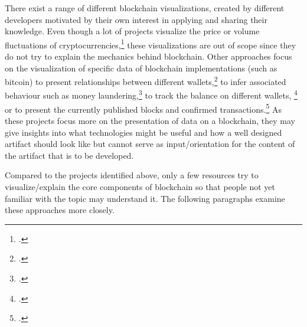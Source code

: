 There exist a range of different blockchain visualizations, created by different developers motivated by their own interest in applying and sharing their knowledge. Even though a lot of projects visualize the price or volume fluctuations of cryptocurrencies,\footcites[Cf.][]{SapekCryptowatchliveBitcoin2014}[cf.][]{CryptoMapsCryptocurrencyMarket} these visualizations are out of scope since they do not try to explain the mechanics behind blockchain. Other approaches focus on the visualization of specific data of blockchain implementations (such as bitcoin) to present relationships between different wallets,\footcites[Cf.][]{Reidanalysisanonymitybitcoin2013}[cf.][]{BaumannExploringBitcoinnetwork2014}[cf.][]{Interaqt2016}[cf.][]{McGinnVisualizingDynamicBitcoin2016}[cf.][]{McGinnOpenDataBlockchain2018} to infer associated behaviour such as money laundering,\footcites[Cf.][]{Meiklejohnfistfulbitcoinscharacterizing2013}[cf.][]{EllipticEnterprisesLimitedEllipticBitcoinBig} to track the balance on different wallets, \footcites[Cf.][]{EtherScanEthereumBlock}[cf.][]{BlcokchainLuxembourgS.A.R.L.BlockchaininfoBitcoin} or to present the currently published blocks and confirmed transactions.\footcites[Cf.][]{BattistaBitconeviewvisualizationflows2015}[cf.][]{BitcoinCityinfoRoad}[cf.][]{Bitbonkers2016}[cf.][]{BlockSeer2015}[cf.][]{DailyBlockchainBlockchain2013}[cf][]{YeowBitcoinNodesGlobal2018}[cf.][]{LaumeisterBitListenBitcoinTransaction2015}[cf.][]{MillerBitcoinVisualizer2015}[cf.][]{VisualizingBitcoinTransactions2015}[cf.][]{Blockchain3DExplorer2017} As these projects focus more on the presentation of data on a blockchain, they may give insights into what technologies might be useful and how a well designed artifact should look like but cannot serve as input/orientation for the content of the artifact that is to be developed. 

Compared to the projects identified above, only a few resources try to visualize/explain the core components of blockchain so that people not yet familiar with the topic may understand it. The following paragraphs examine these approaches more closely. 

